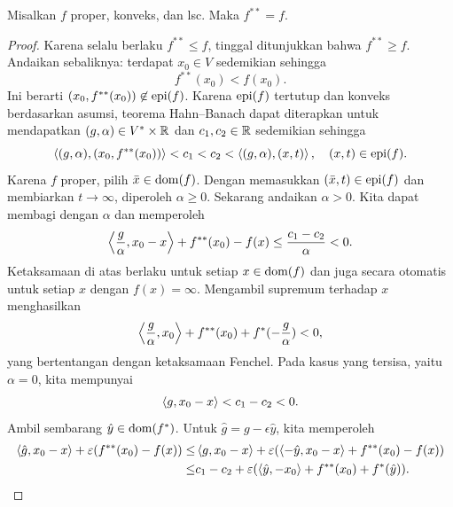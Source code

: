 \begin{lemma}
    Misalkan $f$ proper, konveks, dan lsc. Maka $f^{**} = f$.
\end{lemma}
\begin{proof}
    Karena selalu berlaku $f^{**}\leq f$, tinggal ditunjukkan bahwa $f^{**}\geq f$. Andaikan sebaliknya: terdapat $x_0\in V$ sedemikian sehingga
    \begin{equation}
        f^{**}(x_0) < f(x_0).
    \end{equation}
    Ini berarti $(x_0, f^{**}(x_0))\not\in \operatorname{\mathrm{epi}}(f)$. Karena $\operatorname{\mathrm{epi}}(f)$ tertutup dan konveks berdasarkan asumsi, teorema Hahn--Banach dapat diterapkan untuk mendapatkan $(g,\alpha)\in V^*\times \mathbb{R}$ dan $c_1,c_2\in \mathbb{R}$ sedemikian sehingga
    \begin{equation}
        \left\langle(g,\alpha) , (x_0,f^{**}(x_0))\right\rangle<c_1<c_2<\left\langle(g,\alpha) , (x,t)\right\rangle,\quad (x,t)\in \operatorname{\mathrm{epi}}(f).
    \end{equation}
    Karena $f$ proper, pilih $\bar x\in\operatorname{\mathrm{dom}}(f)$. Dengan memasukkan $(\bar x,t)\in\operatorname{\mathrm{epi}}(f)$ dan membiarkan $t\rightarrow\infty$, diperoleh $\alpha\geq 0$.
    Sekarang andaikan $\alpha>0$. Kita dapat membagi dengan $\alpha$ dan memperoleh
    \begin{equation}
        \left\langle\frac{g}{\alpha} , x_0-x\right\rangle + f^{**}(x_0)-f(x)\leq \frac{c_1-c_2}{\alpha}<0.
    \end{equation}
    Ketaksamaan di atas berlaku untuk setiap $x\in \operatorname{\mathrm{dom}}(f)$ dan juga secara otomatis untuk setiap $x$ dengan $f(x)=\infty$. Mengambil supremum terhadap $x$ menghasilkan
    \begin{equation}
        \left\langle\frac{g}{\alpha} , x_0\right\rangle + f^{**}(x_0)+f^*(-\frac{g}{\alpha})<0,
    \end{equation}
    yang bertentangan dengan ketaksamaan Fenchel.
    Pada kasus yang tersisa, yaitu $\alpha=0$, kita mempunyai
    \begin{equation}
        \left\langle g , x_0-x\right\rangle < c_1-c_2<0.
    \end{equation}
    Ambil sembarang $\hat y\in \operatorname{\mathrm{dom}}(f^*)$. Untuk $\hat g = g-\epsilon \hat y$, kita memperoleh
    \begin{equation}
        \begin{aligned}
            \inner{\hat g}{x_0-x} + \epsilon(f^{**}(x_0)-f(x))
            \leq& \inner{g}{x_0-x} + \epsilon( \inner{-\hat y}{x_0-x} + f^{**}(x_0)-f(x))\\
            \leq& c_1-c_2 + \epsilon( \inner{\hat y}{-x_0} + f^{**}(x_0)+f^*(\hat y)).
        \end{aligned}

\end{equation}
\end{proof}
